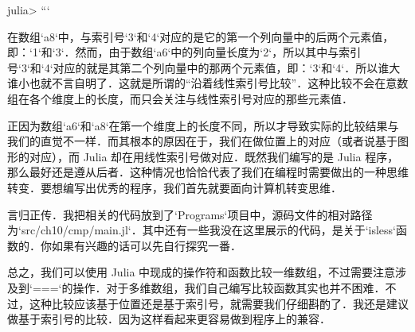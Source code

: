 julia>
```

在数组`a8`中，与索引号`3`和`4`对应的是它的第一个列向量中的后两个元素值，即：`1`和`3`．然而，由于数组`a6`中的列向量长度为`2`，所以其中与索引号`3`和`4`对应的就是其第二个列向量中的那两个元素值，即：`3`和`4`．所以谁大谁小也就不言自明了．这就是所谓的“沿着线性索引号比较”．这种比较不会在意数组在各个维度上的长度，而只会关注与线性索引号对应的那些元素值．

正因为数组`a6`和`a8`在第一个维度上的长度不同，所以才导致实际的比较结果与我们的直觉不一样．而其根本的原因在于，我们在做位置上的对应（或者说基于图形的对应），而 Julia 却在用线性索引号做对应．既然我们编写的是 Julia 程序，那么最好还是遵从后者．这种情况也恰恰代表了我们在编程时需要做出的一种思维转变．要想编写出优秀的程序，我们首先就要面向计算机转变思维．

言归正传．我把相关的代码放到了`Programs`项目中，源码文件的相对路径为`src/ch10/cmp/main.jl`．其中还有一些我没在这里展示的代码，是关于`isless`函数的．你如果有兴趣的话可以先自行探究一番．

总之，我们可以使用 Julia 中现成的操作符和函数比较一维数组，不过需要注意涉及到`===`的操作．对于多维数组，我们自己编写比较函数其实也并不困难．不过，这种比较应该基于位置还是基于索引号，就需要我们仔细斟酌了．我还是建议做基于索引号的比较．因为这样看起来更容易做到程序上的兼容．